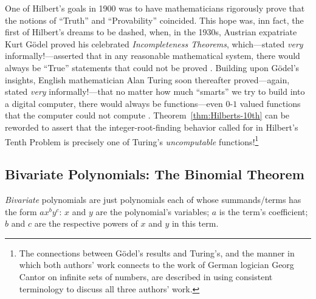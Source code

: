 \noindent {}
\bigskip

\noindent
One of Hilbert's goals in 1900 was to have mathematicians rigorously
prove that the notions of ``Truth'' and ``Provability'' coincided.
This hope was, inn fact, the first of Hilbert's dreams to be dashed,
when, in the 1930s, Austrian expatriate Kurt G\"{o}del
 proved his celebrated {\it Incompleteness
  Theorems}, 
which---stated {\em very} informally!---asserted that in any
reasonable mathematical system, there would always be ``True''
statements that could not be proved \cite{Goedel31}.  Building upon
G\"{o}del's insights, English mathematician Alan Turing
 soon thereafter proved---again, stated {\em very}
informally!---that no matter how much ``smarts'' we try to build into
a digital computer, there would always be functions---even $0$-$1$
valued functions that the computer could not compute \cite{Turing36}.
Theorem~\ref{thm:Hilberts-10th} can be reworded to assert that the
integer-root-finding behavior called for in Hilbert's Tenth Problem is
precisely one of Turing's {\it uncomputable}  functions!\footnote{The connections between G\"{o}del's
  results and Turing's, and the manner in which both authors' work
  connects to the work of German logician Georg Cantor 
 on infinite sets of numbers,
\cite{Cantor74,Cantor78} are described in \cite{Rosenberg09} using
consistent terminology to discuss all three authors' work.}


\subsection{Bivariate Polynomials: The Binomial Theorem}
\label{sec:bivariate-polynomials}
\label{sec:Binomial-thm}

{\em Bivariate} polynomials are just polynomials each of whose
summands/terms has the form $a x^b y^c$: $x$ and $y$ are the polynomial's
variables; $a$ is the term's coefficient; $b$ and $c$ are the
respective powers of $x$ and $y$ in this term.

